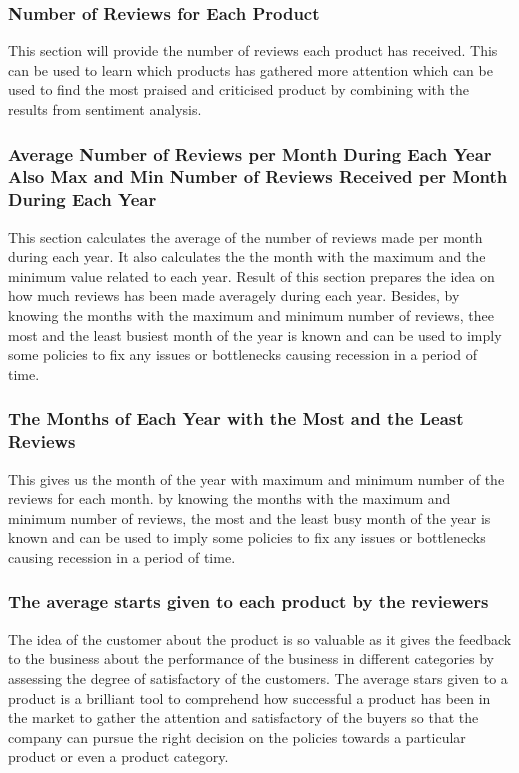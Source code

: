 \subsubsection{Number of Reviews for Each Product}
This section will provide the number of reviews each product has received. This can be used to learn which products has gathered more attention which can be used to find the most praised and criticised product by combining with the results from sentiment analysis. 
\subsubsection{Average Number of Reviews per Month During Each Year Also Max and Min Number of Reviews Received per Month During Each Year}
This section calculates the average of the number of reviews made per month during each year. It also calculates the the month with the maximum and the minimum value related to each year. Result of this section prepares the idea on how much reviews has been made averagely during each year. Besides, by knowing the months with the maximum and minimum number of reviews, thee most and the least busiest month of the year is known and can be used to imply some policies to fix any issues or bottlenecks causing recession in a period of time.

\subsubsection{The Months of Each Year with the Most and the Least Reviews}
This gives us the month of the year with maximum and minimum number of the reviews for each month. by knowing the months with the maximum and minimum number of reviews, the most and the least busy month of the year is known and can be used to imply some policies to fix any issues or bottlenecks causing recession in a period of time.
\subsubsection{The average starts given to each product by the reviewers}
The idea of the customer about the product is so valuable as it gives the feedback to the business about the performance of the business in different categories by assessing the degree of satisfactory of the customers. The average stars given to a product is a brilliant tool to comprehend how successful a product has been in the market to gather the attention and satisfactory of the buyers so that the company can pursue the right decision on the policies towards a particular product or even a product category. 

